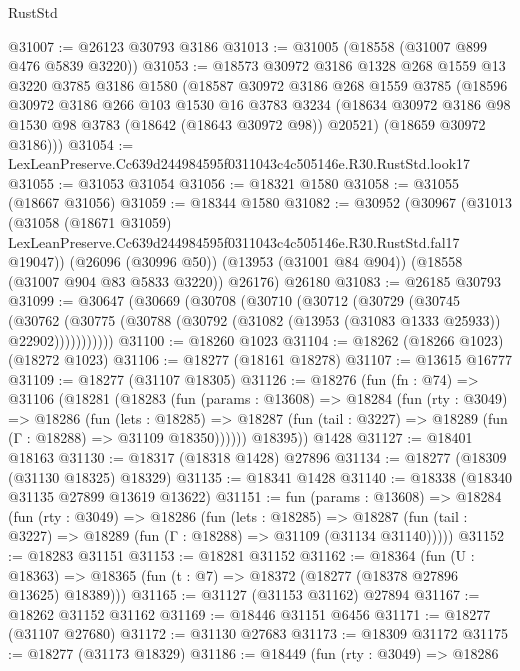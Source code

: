 \begin{lexlean}{RustStd}
\begin{coremodule}
@31007 := @26123 @30793 @3186
@31013 := @31005 (@18558 (@31007 @899 @476 @5839 @3220))
@31053 := @18573
    @30972
    @3186
    @1328
    @268
    @1559
    @13
    @3220
    @3785
    @3186
    @1580
    (@18587
      @30972
      @3186
      @268
      @1559
      @3785
      (@18596
        @30972
        @3186
        @266
        @103
        @1530
        @16
        @3783
        @3234
        (@18634 @30972 @3186 @98 @1530 @98 @3783 (@18642 (@18643 @30972 @98)) @20521)
        (@18659 @30972 @3186)))
@31054 := LexLeanPreserve.Cc639d244984595f0311043c4c505146e.R30.RustStd.look17
@31055 := @31053 @31054
@31056 := @18321 @1580
@31058 := @31055 (@18667 @31056)
@31059 := @18344 @1580
@31082 := @30952
    (@30967
      (@31013
        (@31058
          (@18671 @31059)
          LexLeanPreserve.Cc639d244984595f0311043c4c505146e.R30.RustStd.fal17
          @19047))
      (@26096 (@30996 @50))
      (@13953 (@31001 @84 @904))
      (@18558 (@31007 @904 @83 @5833 @3220))
      @26176)
    @26180
@31083 := @26185 @30793
@31099 := @30647
    (@30669
      (@30708
        (@30710
          (@30712
            (@30729
              (@30745
                (@30762
                  (@30775 (@30788 (@30792 (@31082 (@13953 (@31083 @1333 @25933)) @22902)))))))))))
@31100 := @18260 @1023
@31104 := @18262 (@18266 @1023) (@18272 @1023)
@31106 := @18277 (@18161 @18278)
@31107 := @13615 @16777
@31109 := @18277 (@31107 @18305)
@31126 := @18276
    (fun (fn : @74) =>
    @31106
      (@18281
        (@18283
          (fun (params : @13608) =>
          @18284
            (fun (rty : @3049) =>
            @18286
              (fun (lets : @18285) =>
              @18287 (fun (tail : @3227) => @18289 (fun (Γ : @18288) => @31109 @18350))))))
        @18395))
    @1428
@31127 := @18401 @18163
@31130 := @18317 (@18318 @1428) @27896
@31134 := @18277 (@18309 (@31130 @18325) @18329)
@31135 := @18341 @1428
@31140 := @18338 (@18340 @31135 @27899 @13619 @13622)
@31151 := fun (params : @13608) =>
  @18284
    (fun (rty : @3049) =>
    @18286
      (fun (lets : @18285) =>
      @18287 (fun (tail : @3227) => @18289 (fun (Γ : @18288) => @31109 (@31134 @31140)))))
@31152 := @18283 @31151
@31153 := @18281 @31152
@31162 := @18364
    (fun (U : @18363) => @18365 (fun (t : @7) => @18372 (@18277 (@18378 @27896 @13625) @18389)))
@31165 := @31127 (@31153 @31162) @27894
@31167 := @18262 @31152 @31162
@31169 := @18446 @31151 @6456
@31171 := @18277 (@31107 @27680)
@31172 := @31130 @27683
@31173 := @18309 @31172
@31175 := @18277 (@31173 @18329)
@31186 := @18449
    (fun (rty : @3049) =>
    @18286

\end{coremodule}
\end{lexlean}

